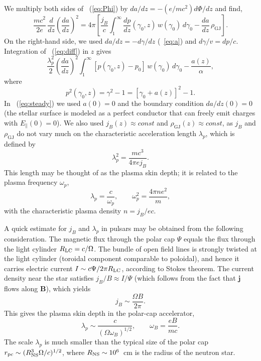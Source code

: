 We multiply both sides of \Eq~(\ref{eq:Phi}) by $da/dz=-(e/mc^2)d\Phi/dz$ and find,
\begin{equation}
\label{eq:diff}
     \frac{mc^2}{2e}\,\frac{d}{dz}\left(\frac{da}{dz}\right)^2
   =4\pi\left[
   \frac{j_B}{c}\int_1^{\infty} \frac{dp}{dz}(\gamma_0,z)\,w(\gamma_0)\,d\gamma_0
         -\frac{da}{dz}\,\rho_\mathrm{GJ}\right].
\end{equation}
On the right-hand side, we used $da/dz=-d\gamma/dz$ (\Eq~\ref{eq:a}) and
$d\gamma/v=dp/c$. Integration of \Eq~(\ref{eq:diff}) in $z$ gives
\begin{equation}
\label{eq:steady}
    \frac{\lambda_p^2}{2}\left(\frac{da}{dz}\right)^2
         \int_1^{\infty} \left[p(\gamma_0,z)-p_0\right]\,w(\gamma_0)\,d\gamma_0
           -\frac{a(z)}{\alpha},
\end{equation}
where
\begin{equation}
   p^2(\gamma_0,z)=\gamma^2-1=\left[\gamma_0+a(z)\right]^2-1.
\end{equation}
In \Eq~(\ref{eq:steady}) we used $a(0)=0$ and the boundary condition $da/dz(0)=0$
(the stellar surface is modeled as a perfect conductor that can freely emit charges
with $E_\parallel(0)=0$). We also used $j_B(z)\approx const$ and
$\rho_\mathrm{GJ}(z)\approx const$, as $j_B$ and $\rho_\mathrm{GJ}$ do not vary much on the
characteristic acceleration length $\lambda_p$, which is defined by
\begin{equation}
\label{eq:lambda}
   \lambda_p^2=\frac{mc^3}{4\pi e j_B}.
\end{equation}
This length may be thought of as the plasma skin depth; it is related to the
plasma frequency $\omega_p$,
\begin{equation}
   \lambda_p=\frac{c}{\omega_p}, \qquad \omega_p^2=\frac{4\pi n e^2}{m},
\end{equation}
with the characteristic plasma density $n=j_B/ec$.

A quick estimate for $j_B$ and $\lambda_p$ in pulsars may be obtained from
the following consideration. The magnetic flux through the polar cap $\Psi$ equals
the flux through the light cylinder $R_{\rm LC}=c/\Omega$.
The bundle of open field lines is strongly twisted at the light cylinder
(toroidal component comparable to poloidal), and hence it carries
electric current $I\sim c\Psi/2\pi R_{\rm LC}$, according to Stokes theorem.
The current density near the star satisfies $j_B/B\approx I/\Psi$
(which follows from the fact that $\mathbf{j}$ flows along $\mathbf{B}$), which yields
\begin{equation}
\label{eq:j_B}
     j_B\sim \frac{\Omega B}{2\pi}.
\end{equation}
This gives the plasma skin depth in the polar-cap accelerator,
\begin{equation}
    \lambda_p \sim \frac{c}{(\Omega\omega_B)^{1/2}},
    \qquad \omega_B=\frac{eB}{mc}.
\end{equation}
The scale $\lambda_p$ is much smaller than the typical size of the polar cap
$r_{\rm pc}\sim(R_{\rm NS}^3\Omega/c)^{1/2}$, where $R_{\rm NS}\sim 10^6$~cm is the radius of
the neutron star.

